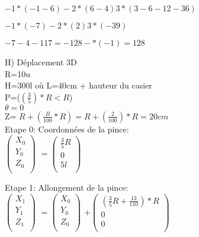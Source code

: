 $
-1*(-1-6)
-2*(6-4)
3*(3-6-12-36)
$

\vspace{5mm} %

$
-1*(-7)
-2*(2)
3*(-39)
$

\vspace{5mm} %

$
-7-4-117=-128-*(-1) = 128
$

\vspace{15mm} %

H) Déplacement 3D \\

R=10u\\
H=300l où L=40cm + hauteur du casier\\
P=($(\frac{3}{5})* R<R$)\\
$\theta =0$\\
Z= $R+(\frac{B}{100}*R) = R+(\frac{2}{100})*R=20cm $\\

Etape 0: Coordonnées de la pince: \\

$
\begin{pmatrix}
  X_{0} \\
  Y_{0} \\
  Z_{0} \\
\end{pmatrix}
$
\vspace{5mm} %
$
=
\begin{pmatrix}
  \frac{3}{5}R \\
  0 \\
  5l \\
\end{pmatrix}
$

Etape 1: Allongement de la pince: \\

$
\begin{pmatrix}
  X_{1} \\
  Y_{1} \\
  Z_{1} \\
\end{pmatrix}
$
\vspace{5mm} %
$
=
\begin{pmatrix}
  X_{0} \\
  Y_{0} \\
  Z_{0} \\
\end{pmatrix}
$
\vspace{5mm} %
$
 +
\begin{pmatrix}
 (\frac{3}{5}R + \frac{13}{110})*R  \\
  0 \\
  0 \\
\end{pmatrix}
$

